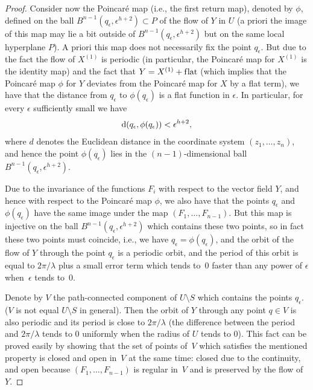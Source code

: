 \begin{proof}
Consider now the Poincar\'e map (i.e., the f\/irst return map), denoted by $\phi$,
def\/ined on the ball $B^{n-1}(q_\epsilon, \epsilon^{h+2}) \subset P$
of the f\/low of $Y$ in $U$
(a priori the image of this map may lie a bit outside of
$B^{n-1}(q_\epsilon, \epsilon^{h+2})$ but on the same
local hyperplane $P$). A priori this map does not necessarily f\/ix
the point $q_\epsilon$. But due to the fact the f\/low of $X^{(1)}$ is
periodic (in particular, the Poincar\'e map for $X^{(1)}$ is the identity map)
and the fact that $Y = X^{(1)} + \text{f\/lat}$ (which implies that the
Poincar\'e map $\phi$ for $Y$ deviates from the Poincar\'e map for $X$ by a
f\/lat term), we have that the distance from $q_\epsilon$ to
$\phi(q_\epsilon)$ is a f\/lat function in $\epsilon$. In particular,
for every $\epsilon$ suf\/f\/iciently small we have
\begin{gather*}
{\rm d}(q_\epsilon , \phi(q_\epsilon)) < \epsilon^{h+2},\end{gather*}
where $d$ denotes the Euclidean distance in the coordinate system $(z_1,\dots, z_n)$, and hence the point
$\phi(q_\epsilon)$ lies in the
$(n-1)$-dimensional ball $B^{n-1}(q_\epsilon, \epsilon^{h+2})$.

Due to the invariance of the functions $F_i$ with respect to
the vector f\/ield $Y$,
and hence with respect to the Poincar\'e map $\phi$, we also have that
the points $q_\epsilon$ and $\phi(q_\epsilon)$ have the same image
under the map $(F_1,\dots,F_{n-1})$. But this map is injective on the ball $B^{n-1}(q_\epsilon, \epsilon^{h+2})$
which contains these two points, so in fact these two points must coincide,
i.e., we have $q_\epsilon = \phi(q_\epsilon)$,
and the orbit of the f\/low of $Y$ through the point $q_\epsilon$ is a periodic orbit, and the period of this orbit
is equal to $2\pi/\lambda$ plus a small error term which tends to~0 faster
than any power of $\epsilon$ when~$\epsilon$ tends to~0.

Denote by $V$ the path-connected component of $U \setminus S$ which contains the points $q_\epsilon$. ($V$ is not equal $U \setminus S$ in general). Then
the orbit of $Y$ through any point $q \in V$ is also periodic and its period is close to $2\pi/\lambda$
(the dif\/ference between the period and $2\pi/\lambda$ tends to 0 uniformly when the radius of $U$ tends to 0). This
fact can be proved easily by showing that the set of points of~$V$ which satisf\/ies the mentioned property is closed
and open in~$V$ at the same time: closed due to the continuity, and open because $(F_1,\dots,F_{n-1})$
is regular in~$V$ and is preserved by the f\/low of~$Y$.


\end{proof}
